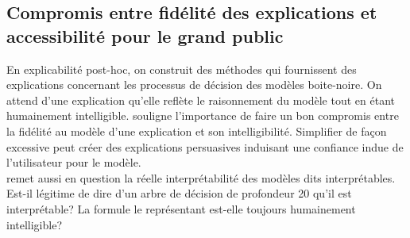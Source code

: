 \documentclass{report}
\newenvironment{comb}
    {\begin{color}{olive}
    }
    { 
    \end{color}
    }
\begin{document}
    
    \subsection{Compromis entre fidélité des explications et accessibilité pour le grand public}
    
    
    En explicabilité post-hoc, on construit des méthodes qui fournissent des explications concernant les processus de décision des modèles boite-noire. On attend d'une explication qu'elle reflète le raisonnement du modèle tout en étant humainement intelligible. \cite{gilpin_explaining_2019} souligne l'importance de faire un bon compromis entre la fidélité au modèle d'une explication et son intelligibilité. Simplifier de façon excessive peut créer des explications persuasives induisant une confiance indue de l'utilisateur pour le modèle. \\
    \cite{molnar_interpretable_2025} remet aussi en question la réelle interprétabilité des modèles dits interprétables. Est-il légitime de dire d'un arbre de décision de profondeur 20 qu'il est interprétable? La formule le représentant est-elle toujours humainement intelligible?
    
\end{document}

